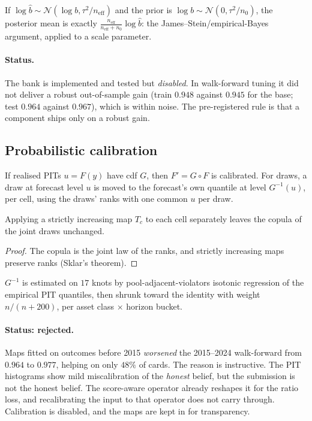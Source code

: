 \begin{remark}
If $\log\hat b\sim\mathcal N(\log b,\tau^2/n_{\mathrm{eff}})$ and the prior is $\log b\sim\mathcal N(0,\tau^2/n_0)$, the posterior mean is
exactly $\frac{n_{\mathrm{eff}}}{n_{\mathrm{eff}}+n_0}\log\hat b$: the James--Stein/empirical-Bayes argument, applied to a scale parameter.
\end{remark}

\paragraph{Status.} The bank is implemented and tested but \emph{disabled}. In walk-forward tuning it did not deliver a robust out-of-sample gain
(train $0.948$ against $0.945$ for the base; test $0.964$ against $0.967$), which is within noise. The pre-registered rule is that a component
ships only on a robust gain.

\subsection{Probabilistic calibration}

If realised PITs $u=F(y)$ have cdf $G$, then $F'=G\circ F$ is calibrated. For draws, a draw at forecast level $u$ is moved to the forecast's
own quantile at level $G^{-1}(u)$, per cell, using the draws' ranks with one common $u$ per draw.

\begin{proposition}
Applying a strictly increasing map $T_c$ to each cell separately leaves the copula of the joint draws unchanged.
\end{proposition}
\begin{proof}
The copula is the joint law of the ranks, and strictly increasing maps preserve ranks (Sklar's theorem).
\end{proof}
$G^{-1}$ is estimated on $17$ knots by pool-adjacent-violators isotonic regression of the empirical PIT quantiles, then shrunk toward the identity
with weight $n/(n+200)$, per asset class $\times$ horizon bucket.

\paragraph{Status: rejected.} Maps fitted on outcomes before 2015 \emph{worsened} the 2015--2024 walk-forward from $0.964$ to $0.977$, helping on
only $48\%$ of cards. The reason is instructive. The PIT histograms show mild miscalibration of the \emph{honest} belief, but the submission is
not the honest belief. The score-aware operator already reshapes it for the ratio loss, and recalibrating the input to that operator does not carry
through. Calibration is disabled, and the maps are kept in  for transparency.
